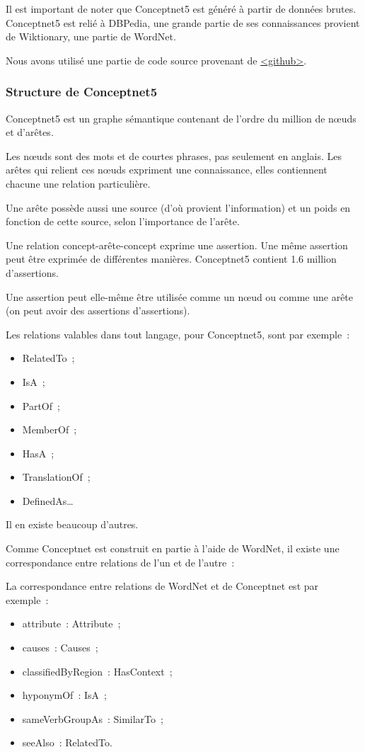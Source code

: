 \documentclass[a4paper, 12pt]{article}
\begin{document}
Il est important de noter que Conceptnet5 est généré à partir de données brutes. Conceptnet5 est relié à DBPedia, une grande partie de ses connaissances provient de Wiktionary, une partie de WordNet.

Nous avons utilisé une partie de code source provenant de \href{https://github.com/commonsense/conceptnet5}{<github>}.


\subsubsection{Structure de Conceptnet5}

Conceptnet5 est un graphe sémantique contenant de l'ordre du million de nœuds et d'ar\^etes.

Les n\oe{}uds sont des mots et de courtes phrases, pas seulement en anglais. Les arêtes qui relient ces n\oe{}uds expriment une connaissance, elles contiennent chacune une relation particulière.

Une arête possède aussi une source (d'où provient l'information) et un poids en fonction de cette source, selon l'importance de l'arête.

Une relation concept-arête-concept exprime une assertion. Une même assertion peut être exprimée de différentes manières. Conceptnet5 contient 1.6 million d'assertions.

Une assertion peut elle-même être utilisée comme un n\oe{}ud ou comme une arête (on peut avoir des assertions d'assertions).

Les relations valables dans tout langage, pour Conceptnet5, sont par exemple~:
\begin{itemize}
 \item RelatedTo~;
 \item IsA~;
 \item PartOf~;
 \item MemberOf~;
 \item HasA~;
 \item TranslationOf~;
 \item DefinedAs\ldots{}
\end{itemize}

Il en existe beaucoup d'autres.

Comme Conceptnet est construit en partie à l'aide de WordNet, il existe une correspondance entre relations de l'un et de l'autre~:

La correspondance entre relations de WordNet et de Conceptnet est par exemple~:
\begin{itemize}
 \item attribute~: Attribute~;
 \item causes~: Causes~;
 \item classifiedByRegion~: HasContext~;
 \item hyponymOf~: IsA~;
 \item sameVerbGroupAs~: SimilarTo~;
 \item seeAlso~: RelatedTo.
\end{itemize}
\end{document}

